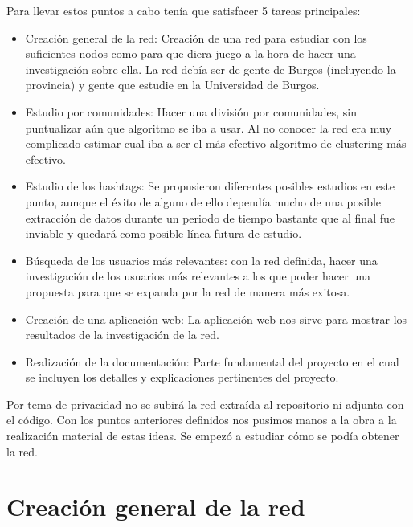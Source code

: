 Para llevar estos puntos a cabo tenía que satisfacer 5 tareas principales:
\begin{itemize}
	\item Creación general de la red: Creación de una red para estudiar con los suficientes nodos como para que diera juego a la hora de hacer una investigación sobre ella. La red debía ser de gente de Burgos (incluyendo la provincia) y gente que estudie en la Universidad de Burgos.
	\item Estudio por comunidades: Hacer una división por comunidades, sin puntualizar aún que algoritmo se iba a usar. Al no conocer la red era muy complicado estimar cual iba a ser el más efectivo algoritmo de clustering más efectivo.
	\item Estudio de los hashtags: Se propusieron diferentes posibles estudios en este punto, aunque el éxito de alguno de ello dependía mucho de una posible extracción de datos durante un periodo de tiempo bastante que al final fue inviable y quedará como posible línea futura de estudio.
	\item Búsqueda de los usuarios más relevantes: con la red definida, hacer una investigación de los usuarios más relevantes a los que poder hacer una propuesta para que se expanda por la red de manera más exitosa. 
	\item Creación de una aplicación web: La aplicación web nos sirve para mostrar los resultados de la investigación de la red.
	\item Realización de la documentación: Parte fundamental del proyecto en el cual se incluyen los detalles y explicaciones pertinentes del proyecto.

\end{itemize}
Por tema de privacidad no se subirá la red extraída al repositorio ni adjunta con el código. 
Con los puntos anteriores definidos nos pusimos manos a la obra a la realización material de estas ideas. Se empezó a estudiar cómo se podía obtener la red.


\section{Creación general de la red}

